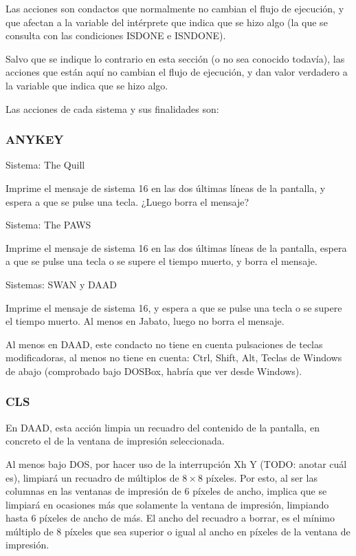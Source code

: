 \documentclass[11pt, a5paper]{article}
\newcommand{\quill}{\textsf{The Quill}\xspace}
\newcommand{\paw}{\textsf{The PAWS}\xspace}
\newcommand{\swan}{\textsf{SWAN}\xspace}
\newcommand{\daad}{\textsf{DAAD}\xspace}
\newcommand{\sistema}[1]{\noindent Sistema: #1 \nopagebreak}
\newcommand{\sistemas}[1]{\noindent Sistemas: #1 \nopagebreak}
\begin{document}
Las acciones son condactos que normalmente no cambian el flujo de ejecución, y que afectan a la variable del intérprete que indica que se hizo algo (la que se consulta con las condiciones ISDONE e ISNDONE).

Salvo que se indique lo contrario en esta sección (o no sea conocido todavía), las acciones que están aquí no cambian el flujo de ejecución, y dan valor verdadero a la variable que indica que se hizo algo.

Las acciones de cada sistema y sus finalidades son:

\subsubsection{ANYKEY}

\sistema{\quill}

Imprime el mensaje de sistema 16 en las dos últimas líneas de la pantalla, y espera a que se pulse una tecla. ¿Luego borra el mensaje?

\sistema{\paw}

Imprime el mensaje de sistema 16 en las dos últimas líneas de la pantalla, espera a que se pulse una tecla o se supere el tiempo muerto, y borra el mensaje.

\sistemas{\swan y \daad}

Imprime el mensaje de sistema 16, y espera a que se pulse una tecla o se supere el tiempo muerto. Al menos en Jabato, luego no borra el mensaje.

Al menos en \daad, este condacto no tiene en cuenta pulsaciones de teclas modificadoras, al menos no tiene en cuenta: Ctrl, Shift, Alt, Teclas de Windows de abajo (comprobado bajo DOSBox, habría que ver desde Windows).

\subsubsection{CLS}

En \daad, esta acción limpia un recuadro del contenido de la pantalla, en concreto el de la ventana de impresión seleccionada.

Al menos bajo DOS, por hacer uso de la interrupción Xh Y (TODO: anotar cuál es), limpiará un recuadro de múltiplos de $8 \times 8$ píxeles. Por esto, al ser las columnas en las ventanas de impresión de 6 píxeles de ancho, implica que se limpiará en ocasiones más que solamente la ventana de impresión, limpiando hasta 6 píxeles de ancho de más. El ancho del recuadro a borrar, es el mínimo múltiplo de 8 píxeles que sea superior o igual al ancho en píxeles de la ventana de impresión.
\end{document}
